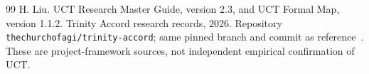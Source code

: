 \begin{thebibliography}{99}
 H. Liu. UCT Research Master Guide, version 2.3, and UCT Formal Map, version 1.1.2. Trinity Accord research records, 2026. Repository \texttt{thechurchofagi/trinity-accord}; same pinned branch and commit as reference~\cite{liucheckpoint}. These are project-framework sources, not independent empirical confirmation of UCT.
\end{thebibliography}

